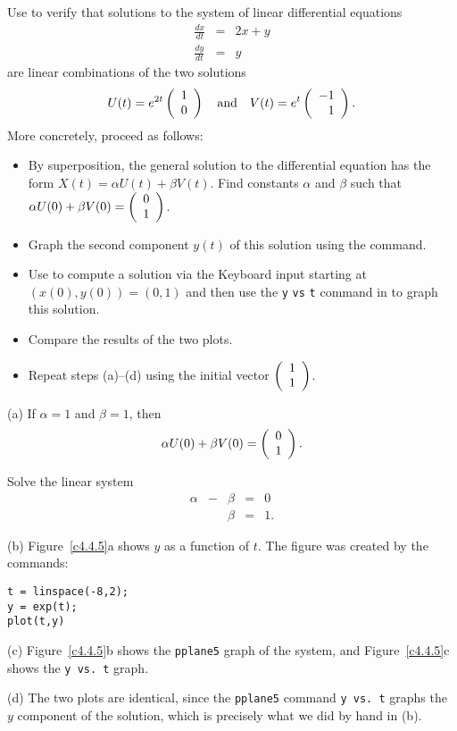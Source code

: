\documentclass{ximera}
\begin{document}
\begin{exercise} \label{c4.4.5}
Use \Matlab to verify that solutions to the system of linear differential
equations
\begin{eqnarray*}
\frac{dx}{dt} & = & 2x + y\\
\frac{dy}{dt} & = & y
\end{eqnarray*}
are linear combinations of the two solutions
\[
U(t) = e^{2t}\left(\begin{array}{r} 1 \\ 0\end{array}\right) \quad\mbox{and}\quad V(t) = e^{t}\left(\begin{array}{r} -1 \\ 1\end{array}\right).
\]
More concretely, proceed as follows:
\begin{itemize}
\item[(a)]  By superposition, the general solution to the differential
equation has the form $X(t)=\alpha U(t) + \beta V(t)$.  Find constants
$\alpha$ and $\beta$ such that $\alpha U(0) + \beta V(0) = \left(\begin{array}{r} 0 \\ 1\end{array}\right)$.
\item[(b)] Graph the second component $y(t)$ of this solution using the
 command.
\item[(c)] Use {\pplane} to compute a solution via the {\sf Keyboard
input} starting at $(x(0),y(0)) = (0,1)$ and then use the
{\tt y} {\tt vs} {\tt t} command in {\pplane} to graph this solution.
\item[(d)] Compare the results of the two plots.
\item[(e)]  Repeat steps (a)--(d) using the initial vector $\left(\begin{array}{r} 1 \\ 1\end{array}\right)$.
\end{itemize}

\begin{solution}

(a) \ans If $\alpha = 1$ and $\beta = 1$, then
\[
\alpha U(0) + \beta V(0) = \left(\begin{array}{r} 0 \\ 1\end{array}\right). 
\]

\soln Solve the linear system
\[
\begin{array}{rrrrl}
\alpha & - & \beta & = & 0 \\
& & \beta & = & 1. \end{array}
\]

(b) Figure~\ref{c4.4.5}a shows $y$ as a function of $t$.  The figure
was created by the \Matlab commands:
\begin{verbatim}
t = linspace(-8,2);
y = exp(t);
plot(t,y)
\end{verbatim}

(c) Figure~\ref{c4.4.5}b shows the {\tt pplane5} graph of the system,
and Figure~\ref{c4.4.5}c shows the {\tt y vs.\ t} graph.

(d) The two plots are identical, since the {\tt pplane5} command
{\tt y vs.\ t} graphs the $y$ component of the solution, which is
precisely what we did by hand in (b).


\end{solution}
\end{exercise}
\end{document}
